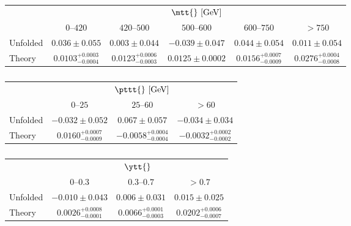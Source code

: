 \begin{table}[!htp]\centering
\begin{tabular}{l c c c c c }
  \toprule
  &\multicolumn{5}{c}{$\mtt{}~[\rm{GeV}]$}    \\
  \ac{} & $0$--$420$ & $420$--$500$ & $500$--$600$ & $600$--$750$ & $>750$ \\
  \midrule
  Unfolded & $0.036\pm0.055$ & $0.003\pm0.044$ & $-0.039\pm0.047$ & $0.044\pm0.054$ & $0.011\pm0.054$ \\
  Theory & $0.0103^{+0.0003}_{-0.0004}$ & $0.0123^{+0.0006}_{-0.0003}$ & $0.0125\pm0.0002$ & $0.0156^{+0.0007}_{-0.0009}$ & $0.0276^{+0.0004}_{-0.0008}$ \\
  \bottomrule
\end{tabular}
\caption{ }
\label{tab:results_mtt}
\end{table}

\begin{table}[!htp]\centering
\caption{ }
\begin{tabular}{l c c c }
  \toprule
  &\multicolumn{3}{c}{$\pttt{}~[\rm{GeV}]$}    \\
  \ac{} &     $0$--$25$           &        $25$--$60$         &  $>60$            \\
  \midrule
  Unfolded  &    $-0.032\pm0.052$       &     $0.067\pm0.057$       &      $-0.034\pm0.034$     \\
  Theory & $0.0160^{+0.0007}_{-0.0009}$ & $-0.0058^{+0.0004}_{-0.0004}$ & $-0.0032^{+0.0002}_{-0.0002}$  \\
  \bottomrule
\end{tabular}
\label{tab:results_pttt}
\end{table}

\begin{table}[!htp]\centering
\caption{ }
\begin{tabular}{l c c c }
  \toprule
  &\multicolumn{3}{c}{$\ytt{}$}    \\
  \ac{}  &     $0$--$0.3$          &        $0.3$--$0.7$     &  $>0.7$            \\
  \midrule
  Unfolded  &    $-0.010\pm0.043$       &     $0.006\pm0.031$     &      $0.015\pm0.025$     \\
  Theory & $0.0026^{+0.0008}_{-0.0001}$ & $0.0066^{+0.0001}_{-0.0003}$ & $0.0202^{+0.0006}_{-0.0007}$ \\
  \bottomrule
\end{tabular}
\label{tab:results_ytt}
\end{table}

